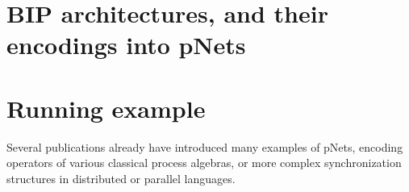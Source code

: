 \documentclass{lncs/llncs}
\begin{document}




\section{BIP architectures, and their encodings into pNets}
\label{section:BIParchitectures}

\section{Running example}
\label{section:FailureTimerMax}

Several publications \cite{HMZ:PDP15,henrio:Forte2016} already have introduced
many examples of pNets, encoding
operators of various classical process algebras, or more complex
synchronization structures in distributed or parallel languages.
\end{document}
